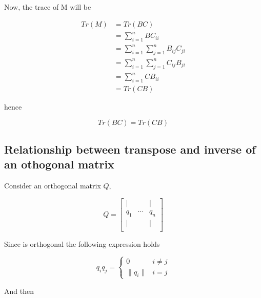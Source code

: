 \documentclass[12pt,journal]{IEEEtran}
\begin{document}
    Now, the trace of M will be

    \begin{equation*}
        \begin{aligned}
            Tr(M) &= Tr(BC)\\
                  &= \sum_{i=1}^n BC_{ii}\\
                  &= \sum_{i=1}^n \sum_{j=1}^n B_{ij} C_{ji}\\
                  &= \sum_{i=1}^n \sum_{j=1}^n C_{ij} B_{ji}\\
                  &= \sum_{i=1}^n CB_{ii}\\
                  &= Tr(CB)
        \end{aligned}
    \end{equation*}

    hence

    \begin{equation*}
        Tr(BC) = Tr(CB)
    \end{equation*}

    \subsection{Relationship between transpose and inverse of an othogonal matrix}
    \label{orthogonal}
    
    Consider an orthogonal matrix $Q$, 

    \[
        Q =
        \begin{bmatrix}
             |  &        &  | \\
            q_1 & \cdots & q_n\\
             |  &        &  | \\
        \end{bmatrix}
    \]

    Since is orthogonal the following expression holds

    \[
        q_i q_j = 
        \begin{cases} 
           0 & i \neq j \\
           \lVert q_i \rVert & i = j 
        \end{cases}
    \]

    And then
\end{document}
